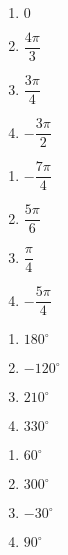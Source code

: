 \documentclass{ximera}
\begin{document}
\begin{multicols}{4}

\begin{enumerate}

\setcounter{enumi}{\value{HW}}

\item $0$ 
\item $\dfrac{4\pi}{3}$
\item $\dfrac{3\pi}{4}$
\item $-\dfrac{3\pi}{2}$

\setcounter{HW}{\value{enumi}}

\end{enumerate}

\end{multicols}

\begin{multicols}{4}

\begin{enumerate}

\setcounter{enumi}{\value{HW}}

\item $-\dfrac{7\pi}{4}$
\item $\dfrac{5\pi}{6}$
\item $\dfrac{\pi}{4}$ 
\item $-\dfrac{5\pi}{4}$

\setcounter{HW}{\value{enumi}}

\end{enumerate}

\end{multicols}

\begin{multicols}{4}

\begin{enumerate}

\setcounter{enumi}{\value{HW}}

\item $180^{\circ}$
\item $-120^{\circ}$
\item $210^{\circ}$
\item $330^{\circ}$

\setcounter{HW}{\value{enumi}}

\end{enumerate}

\end{multicols}

\begin{multicols}{4}

\begin{enumerate}

\setcounter{enumi}{\value{HW}}

\item $60^{\circ}$
\item $300^{\circ}$
\item $-30^{\circ}$
\item $90^{\circ}$

\setcounter{HW}{\value{enumi}}

\end{enumerate}

\end{multicols}
\end{document}

